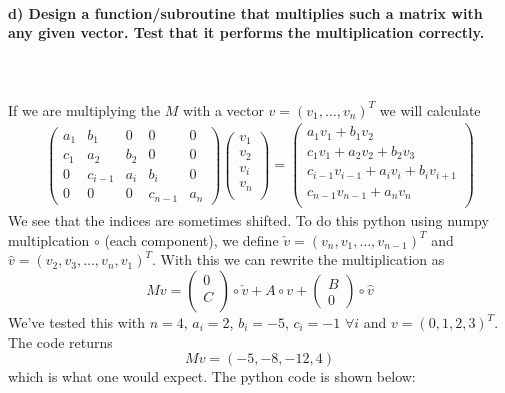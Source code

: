 \paragraph{
    d) Design a function/subroutine that multiplies such a matrix with
    any given vector. Test that it performs the multiplication correctly.
} \ \\
    \\
    If we are multiplying the $M$ with a vector 
    $v = (v_1, \dots, v_n)^T$ we will calculate
    \begin{align}
        \begin{pmatrix}
            a_1 & b_1 & 0      & 0       & 0 \\
            c_1 & a_2 & b_2    & 0       & 0 \\
            0   & c_{i-1} & a_i & b_i    &0    \\
            0   & 0   & 0      & c_{n-1} & a_n
        \end{pmatrix}
        \begin{pmatrix}
            v_1 \\ v_2 \\v_i \\ v_n\\
        \end{pmatrix}=\begin{pmatrix}
            a_1 v_1 + b_1 v_2 \\
            c_1 v_1 + a_2 v_2 + b_2 v_3 \\
            c_{i-1} v_{i-1} + a_i v_i + b_i v_{i+1} \\
            c_{n-1} v_{n-1} + a_n v_n\\
        \end{pmatrix}
    \end{align}
    We see that the indices are sometimes shifted. To do this
    python using numpy multiplcation $\circ$ (each component), we 
    define $\check{v} = (v_n, v_1, \dots, v_{n-1})^T$ and 
    $\hat{v} = (v_2, v_3, \dots, v_n , v_1)^T$. With this we 
    can rewrite the multiplication as
    \begin{equation}
    	Mv =
    	\begin{pmatrix} 0 \\ C \\	\end{pmatrix}
    	\circ \check{v} + A \circ v +
    	\begin{pmatrix} B \\ 0	\end{pmatrix} \circ \hat{v}
    \end{equation}  
    We've tested this with $n=4$, $a_i = 2$, $b_i = -5$, 
    $c_i = -1$ $ \forall i$ and $v = (0,1,2,3)^T$. The code returns
    \begin{equation}
    	Mv = (-5, -8, -12, 4)
    \end{equation}
    which is what one would expect. The python code is shown below:
    


